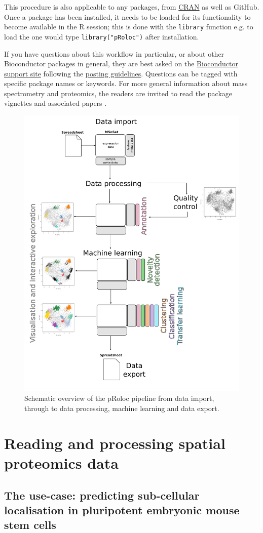 This procedure is also applicable to any packages, from
\href{https://cran.r-project.org/}{CRAN} as well as GitHub. Once a
package has been installed, it needs to be loaded for its
functionality to become available in the R session; this is done with
the \texttt{library} function e.g.  to load the  one
would type \texttt{library("pRoloc")} after installation.

If you have questions about this workflow in particular, or about
other Bioconductor packages in general, they are best asked on the
\href{https://support.bioconductor.org/}{Bioconductor support site}
following the
\href{http://www.bioconductor.org/help/support/posting-guide/}{posting
  guidelines}. Questions can be tagged with specific package names or
keywords. For more general information about mass spectrometry and
proteomics, the readers are invited to read the
 package vignettes and associated
papers \cite{Gatto:2014,Gatto:2015}.

\begin{figure}[!ht]
  \centering
  \includegraphics[width=.5\textwidth]{./Figures/overview.pdf}
  \caption{Schematic overview of the pRoloc pipeline from data import, through to data processing, machine learning and data export.}
  \label{fig:overview}
\end{figure}


\section*{Reading and processing spatial proteomics data}

\subsection*{The use-case: predicting sub-cellular localisation in pluripotent embryonic mouse stem cells}


